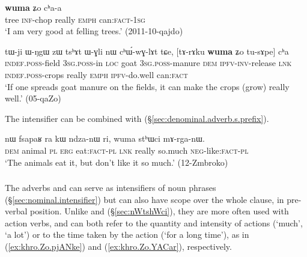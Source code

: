 \begin{exe}
\ex \label{ex:wuma.Zo.chaa}
\gll [si kɤ-pʰaʁ] \textbf{wuma} ʑo cʰa-a \\
tree \textsc{inf}-chop really \textsc{emph} can:\textsc{fact}-\textsc{1sg} \\
\glt `I am very good at felling trees.' (2011-10-qajdo)
\end{exe}

\begin{exe}
\ex \label{ex:wuma.tusApe.cha}
\gll tɯ-ji ɯ-ŋgɯ zɯ tsʰɤt ɯ-ɣli nɯ cʰɯ́-wɣ-lɤt tɕe, [tɤ-rɤku \textbf{wuma} ʑo tu-sɤpe] cʰa \\
\textsc{indef}.\textsc{poss}-field \textsc{3sg}.\textsc{poss}-in \textsc{loc} goat \textsc{3sg}.\textsc{poss}-manure \textsc{dem} \textsc{ipfv}-\textsc{inv}-release \textsc{lnk} \textsc{indef}.\textsc{poss}-crops really \textsc{emph} \textsc{ipfv}-do.well can:\textsc{fact} \\
\glt `If one spreads goat manure on the fields, it can make the crops (grow) really well.' (05-qaZo)
\end{exe}

The intensifier  can be combined with  (§\ref{sec:denominal.adverb.s.prefix}).  

\begin{exe}
\ex \label{ex:wuma.sthWci}
\gll nɯ fsapaʁ ra kɯ ndza-nɯ ri, wuma stʰɯci mɤ-rga-nɯ. \\
\textsc{dem} animal \textsc{pl} \textsc{erg} eat:\textsc{fact}-\textsc{pl} \textsc{lnk} really so.much \textsc{neg}-like:\textsc{fact}-\textsc{pl} \\
\glt `The animals eat it, but don't like it so much.' (12-Zmbroko)
\end{exe}
 
\subsubsection{} \label{sec:khro}
The adverbs  and  can serve as intensifiers of noun phrases (§\ref{sec:nominal.intensifier}) but can also have scope over the whole clause, in pre-verbal position. Unlike  and  (§\ref{sec:nWtshWci}), they are more often used with action verbs, and can both refer to the quantity and intensity of actions (`much', `a lot') or to the time taken by the action (`for a long time'), as in (\ref{ex:khro.Zo.pjANke}) and (\ref{ex:khro.Zo.YACar}), respectively.


